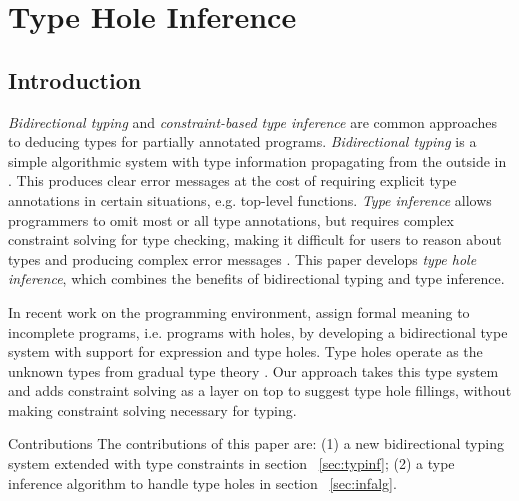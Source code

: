 



\section{Type Hole Inference}
\subsection{Introduction}
\label{sec:intro}
\emph{Bidirectional typing} and \emph{constraint-based type inference} are common approaches to deducing types for partially annotated programs. 
\emph{Bidirectional typing} is a simple algorithmic system with type information propagating from the outside in \cite{BidirTyping}. This produces clear error messages at the cost of requiring explicit type annotations in certain situations, e.g. top-level functions. \emph{Type inference} allows programmers to omit most or all type annotations, but requires complex constraint solving for type checking, making it difficult for users to reason about types and producing complex error messages \cite{typeinferDif}.
This paper develops \emph{type hole inference}, which combines the benefits of bidirectional typing and type inference.\par

In recent work on the \Hazel programming environment, \citet{HazelnutPOPL} assign formal meaning to incomplete programs, i.e. programs with holes, by developing a bidirectional type system with support for expression and type holes. Type holes operate as the unknown types from gradual type theory \cite{GradualTyping}. Our approach takes this type system and adds constraint solving as a layer on top to suggest type hole fillings, without making constraint solving necessary for typing. 

\par{Contributions} The contributions of this paper are: (1) a new bidirectional typing system extended with type constraints in section ~\ref{sec:typinf}; (2) a type inference algorithm to handle type holes in section ~\ref{sec:infalg}.

